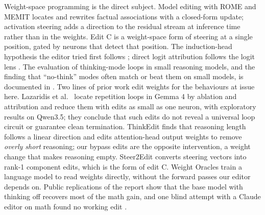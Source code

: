 \documentclass[11pt]{article}
\begin{document}
Weight-space programming \cite{wsp} is the direct subject. Model editing with ROME and MEMIT \cite{rome} locates and rewrites factual associations with a closed-form update; activation steering \cite{steering} adds a direction to the residual stream at inference time rather than in the weights. Edit C is a weight-space form of steering at a single position, gated by neurons that detect that position. The induction-head hypothesis the editor tried first follows \cite{induction}; direct logit attribution follows the logit lens \cite{lens}. The evaluation of thinking-mode loops in small reasoning models, and the finding that ``no-think'' modes often match or beat them on small models, is documented in \cite{qwen35}. Two lines of prior work edit weights for the behaviours at issue here. Lazaridis et al.\ \cite{oneneuron} locate repetition loops in Gemma 4 by ablation and attribution and reduce them with edits as small as one neuron, with exploratory results on Qwen3.5; they conclude that such edits do not reveal a universal loop circuit or guarantee clean termination. ThinkEdit \cite{thinkedit} finds that reasoning length follows a linear direction and edits attention-head output weights to remove \emph{overly short} reasoning; our bypass edits are the opposite intervention, a weight change that makes reasoning empty. Steer2Edit \cite{steer2edit} converts steering vectors into rank-1 component edits, which is the form of edit C. Weight Oracles \cite{oracles} train a language model to read weights directly, without the forward passes our editor depends on. Public replications of the report \cite{hedwig,coletti,shapor,chalmers} show that the base model with thinking off recovers most of the math gain, and one blind attempt with a Claude editor on math found no working edit \cite{chalmers}.
\end{document}
